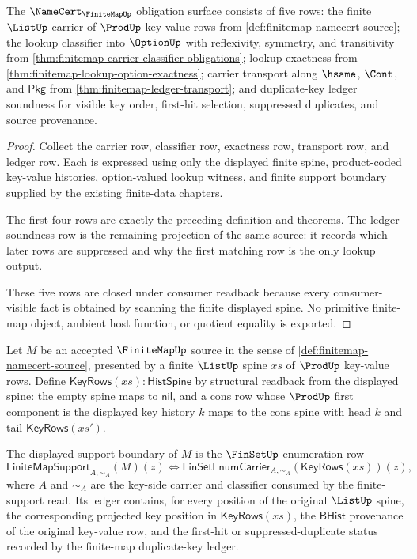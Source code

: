 \begin{theorem}
\label{thm:finitemap-namecert-obligation-surface}
The $\NameCert_{\FiniteMapUp}$ obligation surface consists of five rows: the finite $\ListUp$ carrier of $\ProdUp$ key-value rows from \autoref{def:finitemap-namecert-source}; the lookup classifier into $\OptionUp$ with reflexivity, symmetry, and transitivity from \autoref{thm:finitemap-carrier-classifier-obligations}; lookup exactness from \autoref{thm:finitemap-lookup-option-exactness}; carrier transport along $\hsame$, $\Cont$, and $\mathsf{Pkg}$ from \autoref{thm:finitemap-ledger-transport}; and duplicate-key ledger soundness for visible key order, first-hit selection, suppressed duplicates, and source provenance.
\end{theorem}
\begin{proof}
Collect the carrier row, classifier row, exactness row, transport row, and ledger row. Each is expressed using only the displayed finite spine, product-coded key-value histories, option-valued lookup witness, and finite support boundary supplied by the existing finite-data chapters.

The first four rows are exactly the preceding definition and theorems. The ledger soundness row is the remaining projection of the same source: it records which later rows are suppressed and why the first matching row is the only lookup output.

These five rows are closed under consumer readback because every consumer-visible fact is obtained by scanning the finite displayed spine. No primitive finite-map object, ambient host function, or quotient equality is exported.
\end{proof}

\begin{definition}
\label{def:finitemap-displayed-support-boundary}
Let $M$ be an accepted $\FiniteMapUp$ source in the sense of \autoref{def:finitemap-namecert-source}, presented by a finite $\ListUp$ spine $xs$ of $\ProdUp$ key-value rows. Define $\mathsf{KeyRows}(xs):\mathsf{HistSpine}$ by structural readback from the displayed spine: the empty spine maps to $\mathsf{nil}$, and a cons row whose $\ProdUp$ first component is the displayed key history $k$ maps to the cons spine with head $k$ and tail $\mathsf{KeyRows}(xs')$.

The displayed support boundary of $M$ is the $\FinSetUp$ enumeration row
$$
\mathsf{FiniteMapSupport}_{A,\sim_A}(M)(z)
\Longleftrightarrow
\mathsf{FinSetEnumCarrier}_{A,\sim_A}(\mathsf{KeyRows}(xs))(z),
$$
where $A$ and $\sim_A$ are the key-side carrier and classifier consumed by the finite-support read. Its ledger contains, for every position of the original $\ListUp$ spine, the corresponding projected key position in $\mathsf{KeyRows}(xs)$, the $\mathsf{BHist}$ provenance of the original key-value row, and the first-hit or suppressed-duplicate status recorded by the finite-map duplicate-key ledger.
\end{definition}

